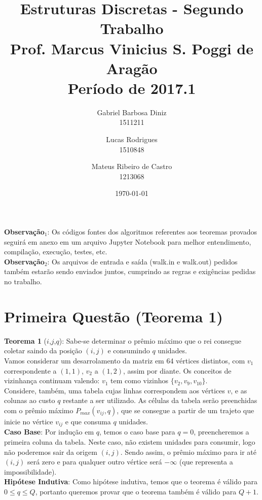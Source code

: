 \documentclass{article}
\title{%
  Estruturas Discretas - Segundo Trabalho\\
  \large Prof. Marcus Vinicius S. Poggi de Aragão\\
  Período de 2017.1}
\author{Gabriel Barbosa Diniz\\1511211 \and Lucas Rodrigues\\1510848 \and Mateus Ribeiro de Castro\\1213068}
\date{\today}
\begin{document}
\maketitle

\textbf{Observação$_1$}: Os códigos fontes dos algoritmos referentes aos teoremas provados seguirá em anexo em um arquivo Jupyter Notebook para melhor entendimento, compilação, execução, testes, etc.\\

\textbf{Observação$_2$}: Os arquivos de entrada e saída (walk.in e walk.out) pedidos também estarão sendo enviados juntos, cumprindo as regras e exigências pedidas no trabalho.

\section{Primeira Questão (Teorema 1)}

\textbf{Teorema 1} ($i$,$j$,$q$): Sabe-se determinar o prêmio máximo que o rei consegue coletar saindo da posição $(i,j)$ e consumindo $q$ unidades.\\

Vamos considerar um desarrolamento da matriz em 64 vértices distintos, com $v_1$ correspondente a $(1,1)$, $v_2$ a $(1,2)$, assim por diante. Os conceitos de vizinhança continuam valendo: $v_1$ tem como vizinhos $\{v_2, v_9, v_10\}$.\\

Considere, também, uma tabela cujas linhas correspondem aos vértices $v$, e as colunas ao custo $q$ restante a ser utilizado. As células da tabela serão preenchidas com o prêmio máximo $P_{max}(v_{ij},q)$, que se consegue a partir de um trajeto que inicie no vértice $v_{ij}$ e que consuma $q$ unidades.\\

\textbf{Caso Base}: Por indução em $q$, temos o caso base para $q = 0$, preencheremos a primeira coluna da tabela. Neste caso, não existem unidades para consumir, logo não poderemos sair da origem $(i,j)$. Sendo assim, o prêmio máximo para ir até $(i,j)$ será zero e para qualquer outro vértice será $-\infty$ (que representa a impossibilidade).\\

\textbf{Hipótese Indutiva}: Como hipótese indutiva, temos que o teorema é válido para $0 \leq q \leq Q$, portanto queremos provar que o teorema também é válido para $Q+1$.\\
\end{document}
